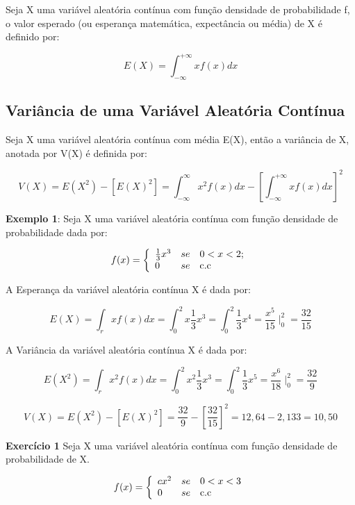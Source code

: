\documentclass[a4paper,12pt]{report}
\begin{document}
{Seja X uma variável aleatória contínua com função densidade de
probabilidade f, o valor esperado (ou esperança matemática,
expectância ou média) de X é definido por:


\begin{equation}\label{}
    E(X)=\int_{-\infty}^{+\infty}xf(x)dx
\end{equation}


\subsection{Variância de uma Variável Aleatória Contínua}

Seja X uma variável aleatória contínua com média E(X), então a
variância de X, anotada por V(X) é definida por:


\begin{equation}\label{}
V(X) = E(X^{2})-[E(X)^{2}]= \int_{-\infty}^{\infty}x^{2}f(x)dx
-\left[\int_{-\infty}^{+\infty}xf(x)dx\right]^{2}
\end{equation}


\textbf{Exemplo 1}: Seja X uma variável aleatória contínua com
função densidade de probabilidade dada por:

$$
f(x)=
\left\{%
\begin{array}{ll}
   \frac{1}{3}x^{3}   & se \quad \hbox{$0 < x < 2$;} \\
   0                  & se \quad \hbox{c.c} \\
\end{array}%
\right.
$$

A Esperança da variável aleatória contínua X é dada por:

$$
E(X)= \int_{r} xf(x)dx = \int^{2}_{0}x\frac{1}{3}x^{3} =
\int^{2}_{0}\frac{1}{3}x^{4} = \frac{x^{5}}{15}\mid^{2}_{0}=
\frac{32}{15}
$$

A Variância da variável aleatória contínua X é dada por:

$$
E(X^{2})= \int_{r} x^{2}f(x)dx = \int^{2}_{0}x^{2}\frac{1}{3}x^{3}
= \int^{2}_{0}\frac{1}{3}x^{5} = \frac{x^{6}}{18}\mid^{2}_{0}=
\frac{32}{9}
$$

$$
V(X) = E(X^{2})-[E(X)^{2}] =
\frac{32}{9}-\left[\frac{32}{15}\right]^{2} = 12,64 - 2,133 =
10,50
$$

\textbf{Exercício 1} Seja X uma variável aleatória contínua com
função densidade de probabilidade de X.


$$
f(x)=
\left\{%
\begin{array}{ll}
   cx^{2}      & se \quad \hbox{$0 < x < 3$} \\
   0           & se \quad \hbox{c.c} \\
\end{array}%
\right.
$$

}
\end{document}

